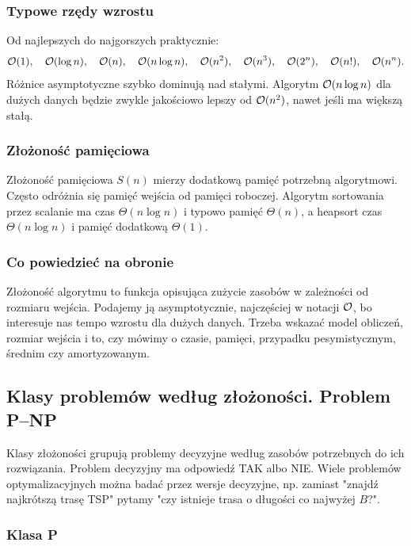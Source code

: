 \subsubsection{Typowe rzędy wzrostu}

Od najlepszych do najgorszych praktycznie:
\[
\mathcal{O}(1),\quad \mathcal{O}(\log n),\quad \mathcal{O}(n),\quad \mathcal{O}(n\log n),\quad
\mathcal{O}(n^2),\quad \mathcal{O}(n^3),\quad \mathcal{O}(2^n),\quad \mathcal{O}(n!),\quad \mathcal{O}(n^n).
\]
Różnice asymptotyczne szybko dominują nad stałymi. Algorytm $\mathcal{O}(n\log n)$ dla dużych danych będzie zwykle jakościowo lepszy od $\mathcal{O}(n^2)$, nawet jeśli ma większą stałą.

\subsubsection{Złożoność pamięciowa}

Złożoność pamięciowa $S(n)$ mierzy dodatkową pamięć potrzebną algorytmowi. Często odróżnia się pamięć wejścia od pamięci roboczej. Algorytm sortowania przez scalanie ma czas $\Theta(n\log n)$ i typowo pamięć $\Theta(n)$, a heapsort czas $\Theta(n\log n)$ i pamięć dodatkową $\Theta(1)$.

\subsubsection{Co powiedzieć na obronie}

Złożoność algorytmu to funkcja opisująca zużycie zasobów w zależności od rozmiaru wejścia. Podajemy ją asymptotycznie, najczęściej w notacji $\mathcal{O}$, bo interesuje nas tempo wzrostu dla dużych danych. Trzeba wskazać model obliczeń, rozmiar wejścia i to, czy mówimy o czasie, pamięci, przypadku pesymistycznym, średnim czy amortyzowanym.

\subsection{Klasy problemów według złożoności. Problem P--NP}

Klasy złożoności grupują problemy decyzyjne według zasobów potrzebnych do ich rozwiązania. Problem decyzyjny ma odpowiedź TAK albo NIE. Wiele problemów optymalizacyjnych można badać przez wersje decyzyjne, np. zamiast "znajdź najkrótszą trasę TSP" pytamy "czy istnieje trasa o długości co najwyżej $B$?".

\subsubsection{Klasa P}

